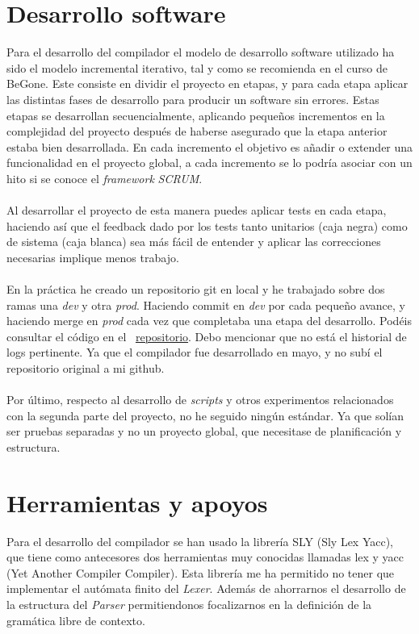 \section{Desarrollo software}
Para el desarrollo del compilador el modelo de desarrollo software utilizado ha sido el modelo incremental iterativo, tal y como se recomienda en el curso de BeGone. Este consiste en dividir el proyecto en etapas, y para cada etapa aplicar las distintas fases de desarrollo para producir un software sin errores. Estas etapas se desarrollan secuencialmente, aplicando pequeños incrementos en la complejidad del proyecto después de haberse asegurado que la etapa anterior estaba bien desarrollada. En cada incremento el objetivo es añadir o extender una funcionalidad en el proyecto global, a cada incremento se lo podría asociar con un hito si se conoce el \textit{framework} \textit{SCRUM}. \\\\
Al desarrollar el proyecto de esta manera puedes aplicar tests en cada etapa, haciendo así que el feedback dado por los tests tanto unitarios (caja negra) como de sistema (caja blanca) sea más fácil de entender y aplicar las correcciones necesarias implique menos trabajo. \\\\
En la práctica he creado un repositorio git en local y he trabajado sobre dos ramas una \textit{dev} y otra \textit{prod}. Haciendo commit en \textit{dev} por cada pequeño avance, y haciendo merge en \textit{prod} cada vez que completaba una etapa del desarrollo. Podéis consultar el código en el ~\href{https://github.com/domingoUnican/TFGPedroCastro/tree/main/code}{repositorio}. Debo mencionar que  no está el historial de logs pertinente. Ya que el compilador fue desarrollado en mayo, y no subí el repositorio original a mi github. \\\\
Por último, respecto al desarrollo de \textit{scripts} y otros experimentos relacionados con la segunda parte del proyecto, no he seguido ningún estándar. Ya que solían ser pruebas separadas y no un proyecto global, que necesitase de planificación y estructura.

\section{Herramientas y apoyos} 
Para el desarrollo del compilador se han usado la librería SLY (Sly Lex Yacc), que tiene como antecesores dos herramientas muy conocidas llamadas lex y yacc (Yet Another Compiler Compiler). Esta librería me ha permitido no tener que implementar el autómata finito del \textit{Lexer}. Además de ahorrarnos el desarrollo de la estructura del \textit{Parser} permitiendonos focalizarnos en la definición de la gramática libre de contexto.